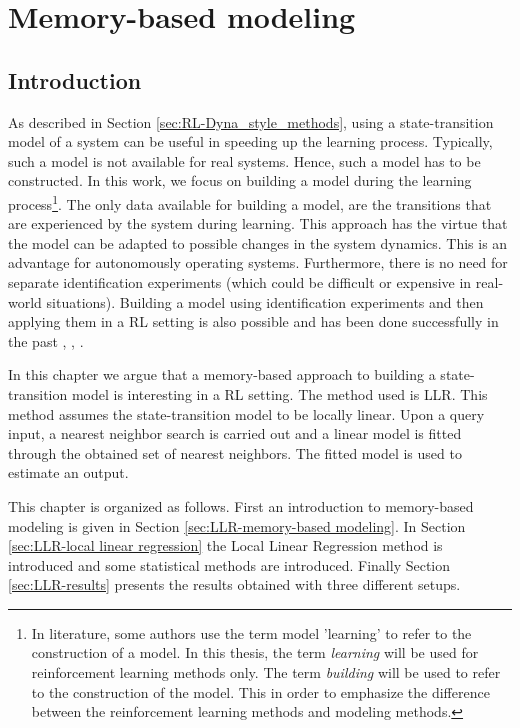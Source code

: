 \chapter{Memory-based modeling}\label{chap:Modeling}

 
\section{Introduction}\label{sec:LLR-introduction}
As described in Section \ref{sec:RL-Dyna_style_methods}, using a state-transition model of a system can be useful in speeding up the learning process. Typically, such a model is not available for real systems. Hence, such a model has to be constructed. In this work, we focus on building a model during the learning process\footnote{In literature, some authors use the term model 'learning' to refer to the construction of a model. In this thesis, the term \emph{learning} will be used for reinforcement learning methods only. The term \emph{building} will be used to refer to the construction of the model. This in order to emphasize the difference between the reinforcement learning methods and modeling methods.}. The only data available for building a model, are the transitions that are experienced by the system during learning. This approach has the virtue that the model can be adapted to possible changes in the system dynamics. This is an advantage for autonomously operating systems. Furthermore, there is no need for separate identification experiments (which could be difficult or expensive in real-world situations). Building a model using identification experiments and then applying them in a \ac{RL} setting is also possible and has been done successfully in the past \cite{Ng:04}, \cite{Bakker:03}, \cite{AtkesonSchaal:97}. 

In this chapter we argue that a memory-based approach to building a state-transition model is interesting in a \ac{RL} setting. The method used is \ac{LLR}. This method assumes the state-transition model to be locally linear. Upon a query input, a nearest neighbor search is carried out and a linear model is fitted through the obtained set of nearest neighbors. The fitted model is used to estimate an output.

This chapter is organized as follows. First an introduction to memory-based modeling is given in Section \ref{sec:LLR-memory-based modeling}. In Section \ref{sec:LLR-local linear regression} the Local Linear Regression method is introduced and some statistical methods are introduced. Finally Section \ref{sec:LLR-results} presents the results obtained with three different setups.





